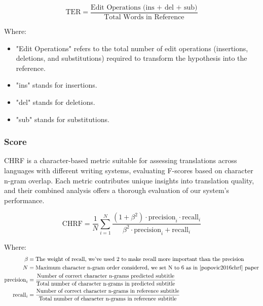 \documentclass[12pt]{article}
\begin{document}
\begin{equation}
	\text{TER} = \frac{\text{Edit Operations (ins + del + sub)}}{\text{Total Words in Reference}}
\end{equation}

Where:

\begin{itemize}
	\item "Edit Operations" refers to the total number of edit operations (insertions, deletions, and substitutions) required to transform the hypothesis into the reference.
	
	\item "ins" stands for insertions.
	
	\item "del" stands for deletions.
	
	\item "sub" stands for substitutions.
\end{itemize}


\subsubsection{\cite{chrf} Score}
CHRF is a character-based metric suitable for assessing translations across languages with different writing systems, evaluating F-scores based on character n-gram overlap. Each metric contributes unique insights into translation quality, and their combined analysis offers a thorough evaluation of our system's performance.

\begin{equation}
	\text{CHRF} = \frac{1}{N} \sum_{i=1}^{N} \frac{(1 + \beta^2) \cdot \text{precision}_i \cdot \text{recall}_i}{\beta^2 \cdot \text{precision}_i + \text{recall}_i}
\end{equation}

Where:
\begin{align*}
	\beta & = \text{The weight of recall, we've used 2 to make recall more important than the precision} \\ 
	N & = \text{Maximum character n-gram order considered, we set N to 6 as in \cite{popovic2016chrf} paper}\\
	\text{precision}_i & = \frac{\text{Number of correct character n-grams predicted subtitle}}{\text{Total number of character n-grams in predicted subtitle}} \\	\text{recall}_i & = \frac{\text{Number of correct character n-grams in reference subtitle}}{\text{Total number of character n-grams in reference subtitle}}
\end{align*}
\end{document}
